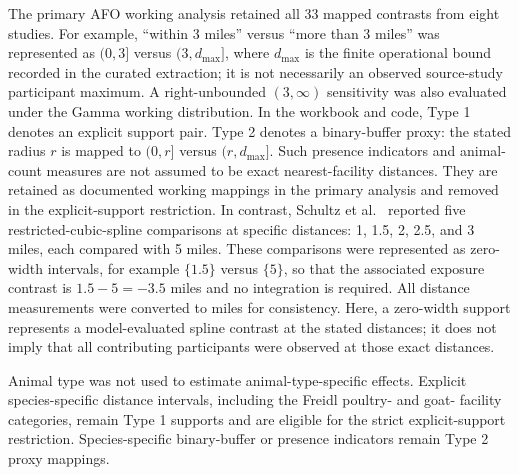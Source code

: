 \documentclass[journal=rsm]{CUP-JNL-DTM}%
\theoremstyle{definition}
\numberwithin{equation}{section}
\begin{document}
The primary AFO working analysis retained all 33 mapped contrasts from eight
studies. For example, ``within 3 miles'' versus ``more than 3 miles'' was
represented as $(0,3]$ versus $(3,d_{\max}]$, where
$d_{\max}$ is the finite operational bound recorded in the curated extraction;
it is not necessarily an observed source-study participant maximum. A
right-unbounded $(3,\infty)$ sensitivity was also evaluated under the Gamma
working distribution. In the workbook and code, Type 1 denotes an explicit
support pair. Type 2 denotes a binary-buffer proxy: the stated radius $r$ is
mapped to $(0,r]$ versus $(r,d_{\max}]$. Such presence indicators and animal-
count measures are not assumed to be exact nearest-facility distances. They
are retained as documented working mappings in the primary analysis and
removed in the explicit-support restriction. In contrast, Schultz et
al.~\cite{Schultz2019} reported five restricted-cubic-spline comparisons at
specific distances: 1, 1.5, 2, 2.5, and 3 miles, each compared with 5 miles.
These comparisons were represented as zero-width intervals, for example
$\{1.5\}$ versus $\{5\}$, so that the associated exposure contrast is
$1.5-5=-3.5$ miles and no integration is required. All distance measurements
were converted to miles for consistency. Here, a zero-width support represents
a model-evaluated spline contrast at the stated distances; it does not imply
that all contributing participants were observed at those exact distances.
 
Animal type was not used to estimate animal-type-specific effects. Explicit
species-specific distance intervals, including the Freidl poultry- and goat-
facility categories, remain Type 1 supports and are eligible for the strict
explicit-support restriction. Species-specific binary-buffer or presence
indicators remain Type 2 proxy mappings.
 
\end{document}
